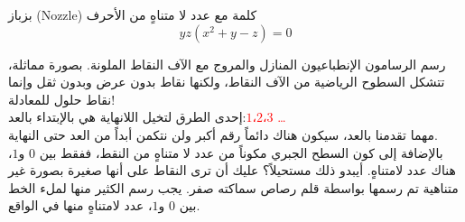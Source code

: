 \begin{surferPage}[بزباز]{بزباز (Nozzle)}
 كلمة مع عدد لا متناهٍ من الأحرف \\
\smallskip
\[y z (x^2	+ y - z) = 0\]

\vspace{0.3cm}
رسم الرسامون الإنطباعيون المنازل والمروج مع الآف النقاط الملونة. بصورة مماثلة، تتشكل السطوح الرياضية من الآف النقاط، ولكنها نقاط بدون عرض وبدون  ثقل وإنما نقاط حلول للمعادلة! \\

\vspace{0.3cm}
إحدى الطرق لتخيل اللانهاية هي بالإبتداء بالعد:\textcolor{red}{$ 1،2،3 $ \dots}\\
مهما تقدمنا بالعد، سيكون هناك دائماً رقم أكبر ولن نتكمن أبداً من العد حتى النهاية.\\
\vspace{0.3cm}
بالإضافة إلى كون السطح الجبري مكوناً من عدد لا متناهٍ من النقط، ففقط بين $0$ و$1$، هناك عدد لامتناهٍ. أيبدو ذلك مستحيلاً؟ عليك أن ترى النقاط على أنها صغيرة بصورة غير متناهية تم رسمها بواسطة قلم رصاص سماكته صفر. يجب رسم الكثير منها لملء الخط بين $0$ و$1$، عدد لامتناهٍ منها في الواقع.
\end{surferPage}
